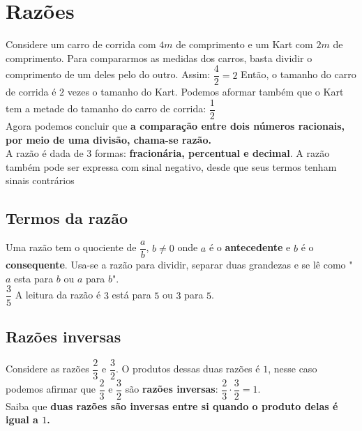 \section{Razões}
Considere um carro de corrida com $4m$ de comprimento e um Kart com $2m$ de comprimento. Para compararmos as medidas dos carros, basta dividir o comprimento de um deles pelo do outro. Assim: $\dfrac{4}{2} = 2$ Então, o tamanho do carro de corrida é $2$ vezes o tamanho do Kart. Podemos aformar também que o Kart tem a metade do tamanho do carro de corrida: $\dfrac{1}{2}$ \\
Agora podemos concluir que \textbf{a comparação entre dois números racionais, por meio de uma divisão, chama-se razão.} \\

A razão é dada de $3$ formas: \textbf{fracionária, percentual e decimal}. A razão também pode ser expressa com sinal negativo, desde que seus termos tenham sinais contrários \\

\subsection{Termos da razão}
Uma razão tem o quociente de $\dfrac{a}{b}$, $b \neq 0$ onde $a$ é o \textbf{antecedente} e $b$ é o \textbf{consequente}. Usa-se a razão para dividir, separar duas grandezas e se lê como "$a$ esta para $b$ ou $a$ para $b$".\\

$\dfrac{3}{5}$ A leitura da razão é $3$ está para $5$ ou $3$ para $5$. \\

\subsection{Razões inversas}
Considere as razões $\dfrac{2}{3}$ e $\dfrac{3}{2}$. O produtos dessas duas razões é $1$, nesse caso podemos afirmar que $\dfrac{2}{3}$ e $\dfrac{3}{2}$ são \textbf{razões inversas}: $\dfrac{2}{3} \cdot \dfrac{3}{2} = 1$.\\

Saiba que \textbf{duas razões são inversas entre si quando o produto delas é igual a $1$.} \\

